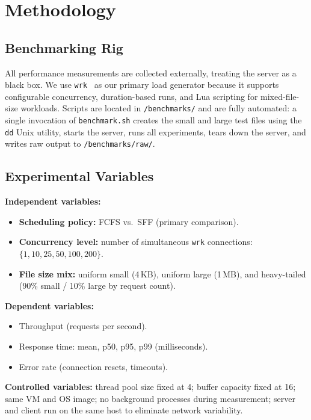 \documentclass[conference]{IEEEtran}
\begin{document}
\section{Methodology}
\label{sec:methodology}

\subsection{Benchmarking Rig}

All performance measurements are collected externally, treating the server
as a black box. We use \texttt{wrk}~\cite{wrk} as our primary load generator
because it supports configurable concurrency, duration-based runs, and Lua
scripting for mixed-file-size workloads. Scripts are located in
\texttt{/benchmarks/} and are fully automated: a single invocation of
\texttt{benchmark.sh} creates the small and large test files using the
\texttt{dd} Unix utility, starts the server, runs all experiments, tears
down the server, and writes raw output to \texttt{/benchmarks/raw/}.

\subsection{Experimental Variables}

\textbf{Independent variables:}
\begin{itemize}
  \item \textbf{Scheduling policy:} FCFS vs.\ SFF (primary comparison).
  \item \textbf{Concurrency level:} number of simultaneous \texttt{wrk}
    connections: $\{1, 10, 25, 50, 100, 200\}$.
  \item \textbf{File size mix:} uniform small (4\,KB), uniform large (1\,MB),
    and heavy-tailed (90\% small / 10\% large by request count).
\end{itemize}

\textbf{Dependent variables:}
\begin{itemize}
  \item Throughput (requests per second).
  \item Response time: mean, p50, p95, p99 (milliseconds).
  \item Error rate (connection resets, timeouts).
\end{itemize}

\textbf{Controlled variables:} thread pool size fixed at 4; buffer capacity
fixed at 16; same VM and OS image; no background processes during measurement;
server and client run on the same host to eliminate network variability.
\end{document}
